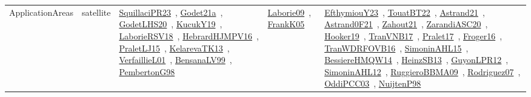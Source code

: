 {\begin{longtable}{lp{3cm}>{\raggedright\arraybackslash}p{6cm}>{\raggedright\arraybackslash}p{6cm}>{\raggedright\arraybackslash}p{8cm}}
ApplicationAreas & satellite & \href{works/SquillaciPR23.pdf}{SquillaciPR23}~\cite{SquillaciPR23}, \href{works/Godet21a.pdf}{Godet21a}~\cite{Godet21a}, \href{works/GodetLHS20.pdf}{GodetLHS20}~\cite{GodetLHS20}, \href{works/KucukY19.pdf}{KucukY19}~\cite{KucukY19}, \href{works/LaborieRSV18.pdf}{LaborieRSV18}~\cite{LaborieRSV18}, \href{works/HebrardHJMPV16.pdf}{HebrardHJMPV16}~\cite{HebrardHJMPV16}, \href{works/PraletLJ15.pdf}{PraletLJ15}~\cite{PraletLJ15}, \href{works/KelarevaTK13.pdf}{KelarevaTK13}~\cite{KelarevaTK13}, \href{works/VerfaillieL01.pdf}{VerfaillieL01}~\cite{VerfaillieL01}, \href{works/BensanaLV99.pdf}{BensanaLV99}~\cite{BensanaLV99}, \href{works/PembertonG98.pdf}{PembertonG98}~\cite{PembertonG98} & \href{works/Laborie09.pdf}{Laborie09}~\cite{Laborie09}, \href{works/FrankK05.pdf}{FrankK05}~\cite{FrankK05} & \href{works/EfthymiouY23.pdf}{EfthymiouY23}~\cite{EfthymiouY23}, \href{works/TouatBT22.pdf}{TouatBT22}~\cite{TouatBT22}, \href{works/Astrand21.pdf}{Astrand21}~\cite{Astrand21}, \href{works/Astrand0F21.pdf}{Astrand0F21}~\cite{Astrand0F21}, \href{works/Zahout21.pdf}{Zahout21}~\cite{Zahout21}, \href{works/ZarandiASC20.pdf}{ZarandiASC20}~\cite{ZarandiASC20}, \href{works/Hooker19.pdf}{Hooker19}~\cite{Hooker19}, \href{works/TranVNB17.pdf}{TranVNB17}~\cite{TranVNB17}, \href{works/Pralet17.pdf}{Pralet17}~\cite{Pralet17}, \href{works/Froger16.pdf}{Froger16}~\cite{Froger16}, \href{works/TranWDRFOVB16.pdf}{TranWDRFOVB16}~\cite{TranWDRFOVB16}, \href{works/SimoninAHL15.pdf}{SimoninAHL15}~\cite{SimoninAHL15}, \href{works/BessiereHMQW14.pdf}{BessiereHMQW14}~\cite{BessiereHMQW14}, \href{works/HeinzSB13.pdf}{HeinzSB13}~\cite{HeinzSB13}, \href{works/GuyonLPR12.pdf}{GuyonLPR12}~\cite{GuyonLPR12}, \href{works/SimoninAHL12.pdf}{SimoninAHL12}~\cite{SimoninAHL12}, \href{works/RuggieroBBMA09.pdf}{RuggieroBBMA09}~\cite{RuggieroBBMA09}, \href{works/Rodriguez07.pdf}{Rodriguez07}~\cite{Rodriguez07}, \href{works/OddiPCC03.pdf}{OddiPCC03}~\cite{OddiPCC03}, \href{works/NuijtenP98.pdf}{NuijtenP98}~\cite{NuijtenP98}\\

\end{longtable}}
